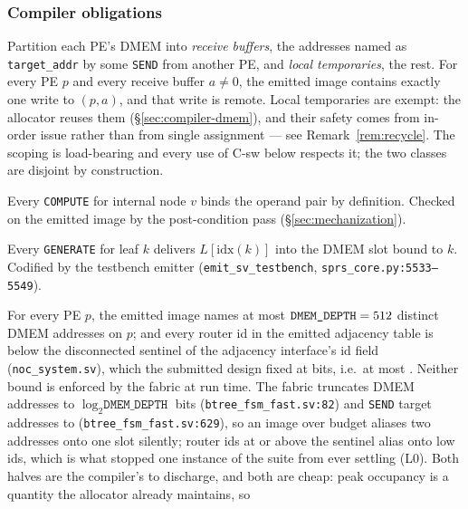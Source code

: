 \documentclass[journal,10pt]{IEEEtran}
\theoremstyle{plain}
\theoremstyle{definition}
\theoremstyle{remark}
\newcommand{\sv}[1]{\texttt{#1}}
\begin{document}
\subsubsection*{Compiler obligations}
\begin{description}[leftmargin=2.2em,style=nextline]
\item[\textsf{C-sw} (Single-writer allocation for remote destinations).]
  Partition each PE's DMEM into \emph{receive buffers}, the addresses named
  as \texttt{target\_addr} by some \texttt{SEND} from another PE, and
  \emph{local temporaries}, the rest. For every PE $p$ and every receive
  buffer $a \neq 0$, the emitted image contains exactly one write to
  $(p,a)$, and that write is remote. Local temporaries are exempt: the
  allocator reuses them (\S\ref{sec:compiler-dmem}), and their safety comes
  from in-order issue rather than from single assignment --- see
  Remark~\ref{rem:recycle}. The scoping is load-bearing and every use of
  \textsf{C-sw} below respects it; the two classes are disjoint by
  construction.
\item[\textsf{C-bind} (Operand binding, Def.~\ref{def:opbind}).] Every
  \texttt{COMPUTE} for internal node $v$ binds the operand pair by
  definition. Checked on the emitted image by the post-condition pass
  (\S\ref{sec:mechanization}).
\item[\textsf{C-leaf} (Leaf binding, Def.~\ref{def:leafbind}).] Every
  \texttt{GENERATE} for leaf $k$ delivers $L[\mathrm{idx}(k)]$ into the
  DMEM slot bound to $k$. Codified by the testbench emitter
  (\sv{emit\_sv\_testbench}, \sv{sprs\_core.py:5533--5549}).
\item[\textsf{C-mem} (Memory feasibility).] For every PE $p$, the emitted
  image names at most $\sv{DMEM\_DEPTH} = \DmemDepth$ distinct DMEM
  addresses on $p$; and every router id in the emitted adjacency table is
  below the disconnected sentinel of the adjacency interface's id field
  (\sv{noc\_system.sv}), which the submitted design fixed at
  \RouterIdBits{} bits, i.e.\ at most \RouterIdMax. Neither bound is
  enforced by the fabric at run time. The fabric truncates DMEM addresses to
  $\log_2 \sv{DMEM\_DEPTH}$ bits (\sv{btree\_fsm\_fast.sv:82}) and
  \texttt{SEND} target addresses to \SendAddrBits{}
  (\sv{btree\_fsm\_fast.sv:629}), so an image over budget aliases two
  addresses onto one slot silently; router ids at or above the sentinel
  alias onto low ids, which is what stopped one instance of the suite from
  ever settling (L0). Both halves are the compiler's to discharge, and both
  are cheap: peak occupancy is a quantity the allocator already maintains, so

\end{description}
\end{document}
